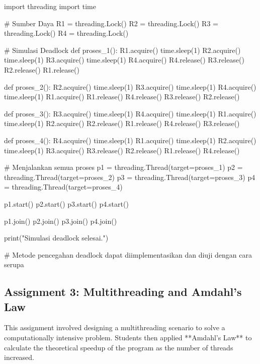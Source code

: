 \documentclass[12pt]{article}
\begin{document}
\begin{python}
    import threading
    import time

    # Sumber Daya
    R1 = threading.Lock()
    R2 = threading.Lock()
    R3 = threading.Lock()
    R4 = threading.Lock()

    # Simulasi Deadlock
    def proses_1():
        R1.acquire()
        time.sleep(1)
        R2.acquire()
        time.sleep(1)
        R3.acquire()
        time.sleep(1)
        R4.acquire()
        R4.release()
        R3.release()
        R2.release()
        R1.release()

    def proses_2():
        R2.acquire()
        time.sleep(1)
        R3.acquire()
        time.sleep(1)
        R4.acquire()
        time.sleep(1)
        R1.acquire()
        R1.release()
        R4.release()
        R3.release()
        R2.release()

    def proses_3():
        R3.acquire()
        time.sleep(1)
        R4.acquire()
        time.sleep(1)
        R1.acquire()
        time.sleep(1)
        R2.acquire()
        R2.release()
        R1.release()
        R4.release()
        R3.release()

    def proses_4():
        R4.acquire()
        time.sleep(1)
        R1.acquire()
        time.sleep(1)
        R2.acquire()
        time.sleep(1)
        R3.acquire()
        R3.release()
        R2.release()
        R1.release()
        R4.release()

    # Menjalankan semua proses
    p1 = threading.Thread(target=proses_1)
    p2 = threading.Thread(target=proses_2)
    p3 = threading.Thread(target=proses_3)
    p4 = threading.Thread(target=proses_4)

    p1.start()
    p2.start()
    p3.start()
    p4.start()

    p1.join()
    p2.join()
    p3.join()
    p4.join()

    print("Simulasi deadlock selesai.")

    # Metode pencegahan deadlock dapat diimplementasikan dan diuji dengan cara serupa

\end{python}

\subsection{Assignment 3: Multithreading and Amdahl's Law}
This assignment involved designing a multithreading scenario to solve a computationally intensive problem. Students then applied **Amdahl's Law** to calculate the theoretical speedup of the program as the number of threads increased.
\end{document}

